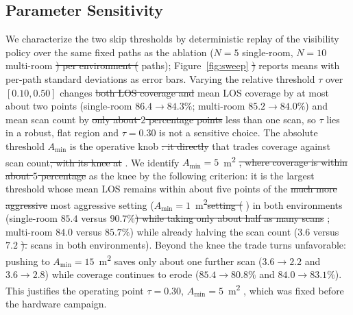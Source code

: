 \documentclass[sensors,article,submit,pdftex,moreauthors]{Definitions/mdpi}
\providecommand{\DIFadd}[1]{{\protect\color{blue} \sf #1}} %
\providecommand{\DIFdel}[1]{{\protect\color{red}\protect\scriptsize\protect\sout{#1}}} %
\providecommand{\DIFaddbegin}{} %
\providecommand{\DIFaddend}{} %
\providecommand{\DIFdelbegin}{} %
\providecommand{\DIFdelend}{} %
\begin{document}
\subsection{Parameter Sensitivity}

We characterize the two skip thresholds by deterministic replay \DIFaddbegin \DIFadd{of the
visibility policy }\DIFaddend over the same fixed paths as the ablation ($N=5$
single-room, $N=10$ multi-room \DIFdelbegin \DIFdel{) per
environment (}\DIFdelend \DIFaddbegin \DIFadd{paths); }\DIFaddend Figure~\ref{fig:sweep} \DIFdelbegin \DIFdel{)}\DIFdelend \DIFaddbegin \DIFadd{reports means
with per-path standard deviations as error bars}\DIFaddend . Varying the relative
threshold $\tau$ over $[0.10,0.50]$ changes \DIFdelbegin \DIFdel{both LOS coverage and }\DIFdelend \DIFaddbegin \DIFadd{mean LOS coverage by at most about
two points (single-room $86.4\to84.3\%$; multi-room $85.2\to84.0\%$) and
mean }\DIFaddend scan count by \DIFdelbegin \DIFdel{only about $2$ percentage points}\DIFdelend \DIFaddbegin \DIFadd{less than one scan}\DIFaddend , so $\tau$ lies in a robust, flat
region and $\tau=0.30$ is not a sensitive choice. The absolute threshold
$A_{\min}$ is the operative knob \DIFdelbegin \DIFdel{: it directly }\DIFdelend \DIFaddbegin \DIFadd{that }\DIFaddend trades coverage against scan count\DIFdelbegin \DIFdel{, with its knee at
}\DIFdelend \DIFaddbegin \DIFadd{. We
identify }\DIFaddend $A_{\min}=5$~m\textsuperscript{2} \DIFdelbegin \DIFdel{, where coverage is within about $5$ percentage
}\DIFdelend \DIFaddbegin \DIFadd{as the knee by the following
criterion: it is the largest threshold whose mean LOS remains within about
five }\DIFaddend points of the \DIFdelbegin \DIFdel{much more aggressive }\DIFdelend \DIFaddbegin \DIFadd{most aggressive setting
(}\DIFaddend $A_{\min}=1$~m\textsuperscript{2}\DIFdelbegin \DIFdel{setting
(}\DIFdelend \DIFaddbegin \DIFadd{) in both environments (single-room $85.4$
versus }\DIFaddend $90.7\%$\DIFdelbegin \DIFdel{) while taking only about half as many scans }\DIFdelend \DIFaddbegin \DIFadd{; multi-room $84.0$ versus $85.7\%$) while already halving
the scan count }\DIFaddend ($3.6$ versus $7.2$ \DIFdelbegin \DIFdel{). }\DIFdelend \DIFaddbegin \DIFadd{scans in both environments). Beyond the
knee the trade turns unfavorable: pushing to
$A_{\min}=15$~m\textsuperscript{2} saves only about one further scan
($3.6\to2.2$ and $3.6\to2.8$) while coverage continues to erode
($85.4\to80.8\%$ and $84.0\to83.1\%$). }\DIFaddend This justifies the operating point
$\tau=0.30$, $A_{\min}=5$~m\textsuperscript{2}\DIFaddbegin \DIFadd{, which was fixed before the
hardware campaign}\DIFaddend .
\end{document}
